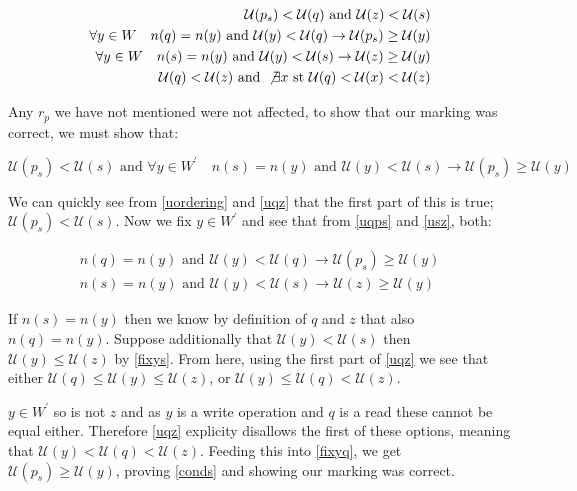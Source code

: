 \documentclass[twoside,a4paper]{report}
\begin{document}
\begin{align}
\mathcal{U}(p_s) < \mathcal{U}(q) \text{ and } \mathcal{U}(z) < \mathcal{U}(s) \label{uordering} \\
\forall y \in W \quad n(q) = n(y) \text{ and } \mathcal{U}(y) < \mathcal{U}(q) \rightarrow \mathcal{U}(p_s) \ge \mathcal{U}(y) \label{uqps} \\
\forall y \in W \quad n(s) = n(y) \text{ and } \mathcal{U}(y) < \mathcal{U}(s) \rightarrow \mathcal{U}(z) \ge \mathcal{U}(y) \label{usz} \\
\mathcal{U}(q) < \mathcal{U}(z) \text{ and } \not \exists x \text{ st } \mathcal{U}(q) < \mathcal{U}(x) < \mathcal{U}(z) \label{uqz}
\end{align}

Any $r_p$ we have not mentioned were not affected, to show that our marking was correct, we must show that:

\begin{equation} \label{conds}
\mathcal{U}(p_s) < \mathcal{U}(s) \text{ and }
\forall y \in W^\prime \quad n(s) = n(y) \text{ and } \mathcal{U}(y) < \mathcal{U}(s) \rightarrow \mathcal{U}(p_s) \ge \mathcal{U}(y)
\end{equation}

We can quickly see from \eqref{uordering} and \eqref{uqz} that the first part of this is true; $\mathcal{U}(p_s) < \mathcal{U}(s)$. Now we fix
$y \in W^\prime$ and see that from \eqref{uqps} and \eqref{usz}, both:

\begin{align}
n(q) = n(y) \text{ and } \mathcal{U}(y) < \mathcal{U}(q) \rightarrow \mathcal{U}(p_s) \ge \mathcal{U}(y) \label{fixyq} \\
n(s) = n(y) \text{ and } \mathcal{U}(y) < \mathcal{U}(s) \rightarrow \mathcal{U}(z) \ge \mathcal{U}(y) \label{fixys}
\end{align}

If $n(s) = n(y)$ then we know by definition of $q$ and $z$ that also $n(q) = n(y)$. Suppose additionally that $\mathcal{U}(y) < \mathcal{U}(s)$ then
$\mathcal{U}(y) \le \mathcal{U}(z)$ by \eqref{fixys}. From here, using the first part of \eqref{uqz} we see that either $\mathcal{U}(q) \le \mathcal{U}(y) \le \mathcal{U}(z)$, or
$\mathcal{U}(y) \le \mathcal{U}(q) < \mathcal{U}(z)$.

$y \in W^\prime$ so is not $z$ and as $y$ is a write operation and $q$ is a read these cannot be equal either. Therefore \eqref{uqz} explicity disallows
the first of these options, meaning that $\mathcal{U}(y) < \mathcal{U}(q) < \mathcal{U}(z)$. Feeding this into \eqref{fixyq}, we get
$\mathcal{U}(p_s) \ge \mathcal{U}(y)$, proving \eqref{conds} and showing our marking was correct.
\end{document}

